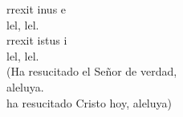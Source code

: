 \begin{cancion}%
	rrexit inus e\\
	lel, lel.\\
	rrexit istus i\\
	lel, lel.\\
(Ha resucitado el Señor de verdad, \\
aleluya.\\
ha resucitado Cristo hoy, aleluya)\\
\end{cancion}%
